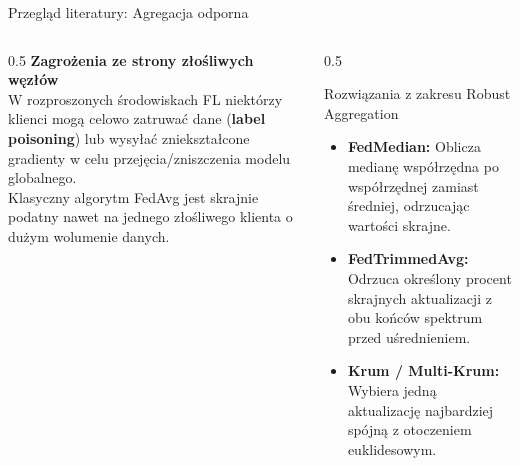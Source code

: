 \documentclass[9pt,aspectratio=169]{beamer}
\begin{document}
\begin{frame}{Przegląd literatury: Agregacja odporna}
\begin{columns}[T]
\begin{column}{0.5\textwidth}
\textbf{Zagrożenia ze strony złośliwych węzłów}\\[4pt]
W rozproszonych środowiskach FL niektórzy klienci mogą celowo zatruwać dane (\textbf{label poisoning}) lub wysyłać zniekształcone gradienty w celu przejęcia/zniszczenia modelu globalnego.\\[6pt]
Klasyczny algorytm FedAvg jest skrajnie podatny nawet na jednego złośliwego klienta o dużym wolumenie danych.
\end{column}
\begin{column}{0.5\textwidth}
\begin{infoboxorange}{Rozwiązania z zakresu Robust Aggregation}
\begin{itemize}\footnotesize
\item \textbf{FedMedian:} Oblicza medianę współrzędna po współrzędnej zamiast średniej, odrzucając wartości skrajne.
\item \textbf{FedTrimmedAvg:} Odrzuca określony procent skrajnych aktualizacji z obu końców spektrum przed uśrednieniem.
\item \textbf{Krum / Multi-Krum:} Wybiera jedną aktualizację najbardziej spójną z otoczeniem euklidesowym.
\end{itemize}
\end{infoboxorange}
\end{column}
\end{columns}
\end{frame}
\end{document}

